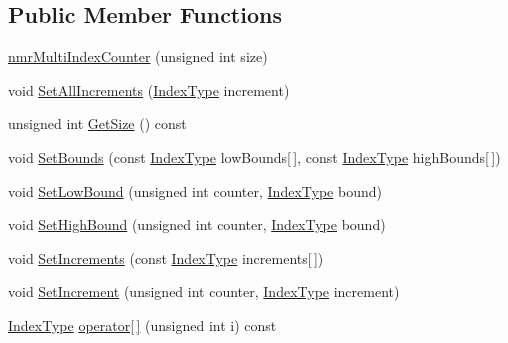 \subsection*{Public Member Functions}
\begin{DoxyCompactItemize}
\item 
\hyperlink{classnmr_multi_index_counter_a383941c773814589d6ad04ba83edf71c}{nmr\-Multi\-Index\-Counter} (unsigned int size)
\item 
void \hyperlink{classnmr_multi_index_counter_af1bb384088b5b39cf86815c0f4c0d26a}{Set\-All\-Increments} (\hyperlink{classnmr_multi_index_counter_a0632b941a7d18df347174b4345d73d01}{Index\-Type} increment)
\item 
unsigned int \hyperlink{classnmr_multi_index_counter_ab6fe790ac273d6bb17bec5ba8c67154e}{Get\-Size} () const 
\item 
void \hyperlink{classnmr_multi_index_counter_af0acb59056271a7972422ec9cb27801c}{Set\-Bounds} (const \hyperlink{classnmr_multi_index_counter_a0632b941a7d18df347174b4345d73d01}{Index\-Type} low\-Bounds\mbox{[}$\,$\mbox{]}, const \hyperlink{classnmr_multi_index_counter_a0632b941a7d18df347174b4345d73d01}{Index\-Type} high\-Bounds\mbox{[}$\,$\mbox{]})
\item 
void \hyperlink{classnmr_multi_index_counter_a88d5e34b5cc436822b87c0f1d64a9e71}{Set\-Low\-Bound} (unsigned int counter, \hyperlink{classnmr_multi_index_counter_a0632b941a7d18df347174b4345d73d01}{Index\-Type} bound)
\item 
void \hyperlink{classnmr_multi_index_counter_a03edb8a4ca7e8f4286be1aa0ad313888}{Set\-High\-Bound} (unsigned int counter, \hyperlink{classnmr_multi_index_counter_a0632b941a7d18df347174b4345d73d01}{Index\-Type} bound)
\item 
void \hyperlink{classnmr_multi_index_counter_a9d1f352f2afdf36d09192fa6bfacf74c}{Set\-Increments} (const \hyperlink{classnmr_multi_index_counter_a0632b941a7d18df347174b4345d73d01}{Index\-Type} increments\mbox{[}$\,$\mbox{]})
\item 
void \hyperlink{classnmr_multi_index_counter_aceecc9513b02feb8e661cd646bf4a6da}{Set\-Increment} (unsigned int counter, \hyperlink{classnmr_multi_index_counter_a0632b941a7d18df347174b4345d73d01}{Index\-Type} increment)
\item 
\hyperlink{classnmr_multi_index_counter_a0632b941a7d18df347174b4345d73d01}{Index\-Type} \hyperlink{classnmr_multi_index_counter_a12dcd653706590b99922d5a3201e185b}{operator\mbox{[}$\,$\mbox{]}} (unsigned int i) const 
\item 

\end{DoxyCompactItemize}
